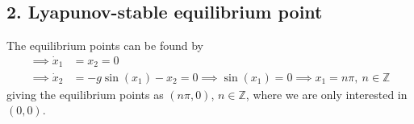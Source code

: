 \subsection*{2. Lyapunov-stable equilibrium point}

The equilibrium points can be found by
\begin{align*}
    \implies
    \dot{x}_{1}
     & =
    x_{2} = 0
    \\
    \implies
    \dot{x}_{2}
     & =
    -g \sin (x_{1}) - x_{2} = 0
    \implies
    \sin (x_{1}) = 0
    \implies
    x_{1} = n \pi, \ n \in \mathbb{Z}
\end{align*}
giving the equilibrium points as \( (n \pi, 0) \), \( n \in \mathbb{Z} \), where we are only interested in \( (0, 0) \).
